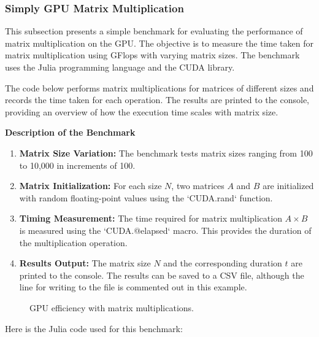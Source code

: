 \subsubsection{Simply GPU Matrix Multiplication}

This subsection presents a simple benchmark for evaluating the performance of matrix multiplication on the GPU. The objective is to measure the time taken for matrix multiplication using GFlops with varying matrix sizes. The benchmark uses the Julia programming language and the CUDA library.

The code below performs matrix multiplications for matrices of different sizes and records the time taken for each operation. The results are printed to the console, providing an overview of how the execution time scales with matrix size.

\begin{center}
   \textbf{Description of the Benchmark}   
\end{center}

\begin{enumerate}
   \item \textbf{Matrix Size Variation:} The benchmark tests matrix sizes ranging from 100 to 10,000 in increments of 100.
   \item \textbf{Matrix Initialization:} For each size \(N\), two matrices \(A\) and \(B\) are initialized with random floating-point values using the `CUDA.rand` function.
   \item  \textbf{Timing Measurement:} The time required for matrix multiplication \(A \times B\) is measured using the `CUDA.@elapsed` macro. This provides the duration of the multiplication operation.
   \item  \textbf{Results Output:} The matrix size \(N\) and the corresponding duration \(t\) are printed to the console. The results can be saved to a CSV file, although the line for writing to the file is commented out in this example.
\end{enumerate}

\begin{figure}[h]
    \begin{center}
        
   \end{center}
   \caption{GPU efficiency with matrix multiplications.}
   \label{}
\end{figure}


Here is the Julia code used for this benchmark:

